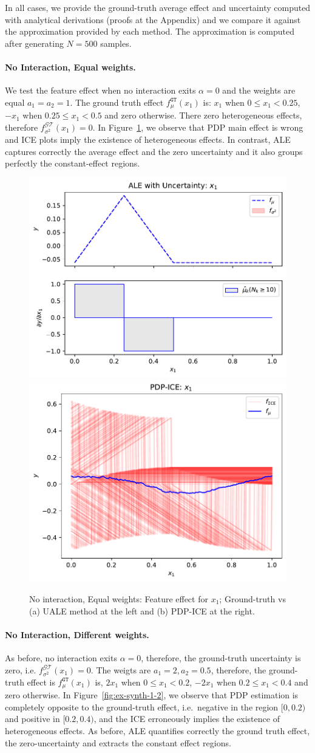\documentclass[twoside]{article}
\begin{document}
In all cases, we provide the ground-truth average effect and
uncertainty computed with analytical derivations (proofs at the
Appendix) and we compare it against the approximation provided by each
method. The approximation is computed after generating \(N=500\)
samples.

\paragraph{No Interaction, Equal weights.}

We test the feature effect when no interaction exits \(\alpha=0\) and
the weights are equal \(a_1=a_2=1\). The ground truth effect
\(f_\mu^{\mathtt{GT}}(x_1)\) is: \(x_1\) when \(0 \leq x_1 < 0.25\),
\(-x_1\) when \(0.25 \leq x_1 < 0.5\) and zero otherwise. There zero
heterogeneous effects, therefore
\(f^{\mathcal{GT}}_{\sigma^2}(x_1) = 0\). In
Figure~\ref{fig:synth-ex-1-case-1}, we observe that PDP main effect is
wrong and ICE plots imply the existence of heterogeneous effects. In
contrast, ALE captures correctly the average effect and the zero
uncertainty and it also groups perfectly the constant-effect regions.

\begin{figure}[h]
  \centering
  \includegraphics[width=.23\textwidth]{example_1/dale_feat_0.pdf}
  \includegraphics[width=.23\textwidth]{example_1/pdp_ice_feat_0.pdf}
  \caption{No interaction, Equal weights: Feature effect for \(x_1\);
    Ground-truth vs (a) UALE method at the left and (b) PDP-ICE at the
    right.}
  \label{fig:synth-ex-1-case-1}
\end{figure}

\paragraph{No Interaction, Different weights.}

As before, no interaction exits \(\alpha=0\), therefore, the
ground-truth uncertainty is zero, i.e.
\(f^{\mathcal{GT}}_{\sigma^2}(x_1) = 0\). The weigts are
\(a_1=2, a_2=0.5\), therefore, the ground-truth effect is
\(f_\mu^{\mathtt{GT}}(x_1)\) is, \(2x_1\) when \(0 \leq x_1 < 0.2\),
\(-2x_1\) when \(0.2 \leq x_1 < 0.4\) and zero otherwise. In
Figure~\ref{fig:ex-synth-1-2}, we observe that PDP estimation is
completely opposite to the ground-truth effect, i.e.~negative in the
region \([0, 0.2)\) and positive in \([0.2, 0.4)\), and the ICE
erroneously implies the existence of heterogeneous effects. As before,
ALE quantifies correctly the ground truth effect, the
zero-uncertainty and extracts the constant effect regions.
\end{document}

